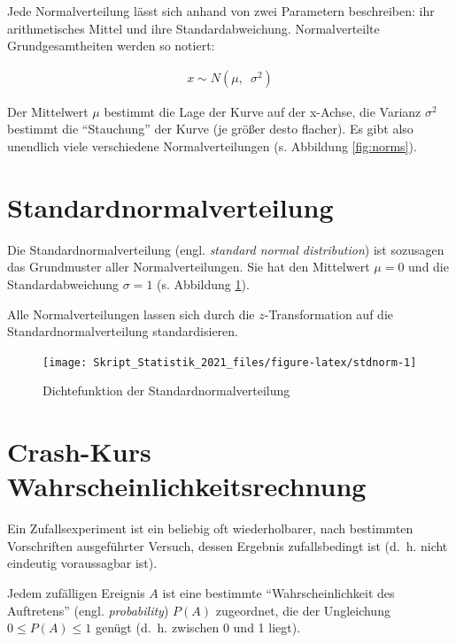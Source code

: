 \documentclass[
  11pt,
  ngerman,
  a4paper,
]{report}
\begin{document}
Jede Normalverteilung lässt sich anhand von zwei Parametern beschreiben: ihr arithmetisches Mittel und ihre Standardabweichung. Normalverteilte Grundgesamtheiten werden so notiert:

\nopagebreak

\[\begin{aligned}
x \sim N(\mu,\enspace\sigma^2)
\end{aligned}
\label{eq:norm}\]

Der Mittelwert \(\mu\) bestimmt die Lage der Kurve auf der x-Achse, die Varianz \(\sigma^2\) bestimmt die \enquote{Stauchung} der Kurve (je größer desto flacher). Es gibt also unendlich viele verschiedene Normalverteilungen (s. Abbildung \ref{fig:norms}).

\hypertarget{standardnormalverteilung}{%
\section{Standardnormalverteilung}\label{standardnormalverteilung}}

Die Standardnormalverteilung (engl. \emph{standard normal distribution}) ist sozusagen das Grundmuster aller Normalverteilungen. Sie hat den Mittelwert \(\mu=0\) und die Standardabweichung \(\sigma=1\) (s. Abbildung \ref{fig:stdnorm}).

Alle Normalverteilungen lassen sich durch die \(z\)-Transformation auf die Standardnormalverteilung standardisieren.

\begin{figure}[!h]

{\centering \texttt{[image: Skript\_Statistik\_2021\_files/figure-latex/stdnorm-1]} 

}

\caption{Dichtefunktion der Standardnormalverteilung}\label{fig:stdnorm}
\end{figure}

\hypertarget{crash-kurs-wahrscheinlichkeitsrechnung}{%
\section{Crash-Kurs Wahrscheinlichkeitsrechnung}\label{crash-kurs-wahrscheinlichkeitsrechnung}}

Ein Zufallsexperiment ist ein beliebig oft wiederholbarer, nach bestimmten Vorschriften ausgeführter Versuch, dessen Ergebnis zufallsbedingt ist (d.~h. nicht eindeutig voraussagbar ist).

Jedem zufälligen Ereignis \(A\) ist eine bestimmte \enquote{Wahrscheinlichkeit des Auftretens} (engl. \emph{probability}) \(P(A)\) zugeordnet, die der Ungleichung \(0 \leq P(A) \leq 1\) genügt (d.~h. zwischen 0 und 1 liegt).
\end{document}
